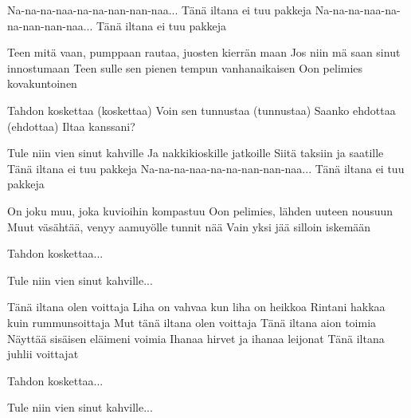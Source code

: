 


	
\beginverse*		%
Na-na-na-naa-na-na-nan-nan-naa...
Tänä iltana ei tuu pakkeja
Na-na-na-naa-na-na-nan-nan-naa...
Tänä iltana ei tuu pakkeja
\endverse			%

\beginverse*		%
Teen mitä vaan, pumppaan rautaa, juosten kierrän maan
Jos niin mä saan sinut innostumaan
Teen sulle sen pienen tempun vanhanaikaisen
Oon pelimies kovakuntoinen
\endverse			%

\beginchorus
Tahdon koskettaa (koskettaa)
Voin sen tunnustaa (tunnustaa)
Saanko ehdottaa (ehdottaa)
Iltaa kanssani?

Tule niin vien sinut kahville
Ja nakkikioskille jatkoille
Siitä taksiin ja saatille
Tänä iltana ei tuu pakkeja
Na-na-na-naa-na-na-nan-nan-naa...
Tänä iltana ei tuu pakkeja
\endchorus

\beginverse*		%
On joku muu, joka kuvioihin kompastuu
Oon pelimies, lähden uuteen nousuun
Muut väsähtää, venyy aamuyölle tunnit nää
Vain yksi jää silloin iskemään
\endverse			%

\beginchorus
Tahdon koskettaa...

Tule niin vien sinut kahville...
\endchorus

\beginverse*		%
Tänä iltana olen voittaja
Liha on vahvaa kun liha on heikkoa
Rintani hakkaa kuin rummunsoittaja
Mut tänä iltana olen voittaja
Tänä iltana aion toimia
Näyttää sisäisen eläimeni voimia
Ihanaa hirvet ja ihanaa leijonat
Tänä iltana juhlii voittajat
\endverse			%

\beginchorus
Tahdon koskettaa...

Tule niin vien sinut kahville...
\endchorus
\endsong			%
